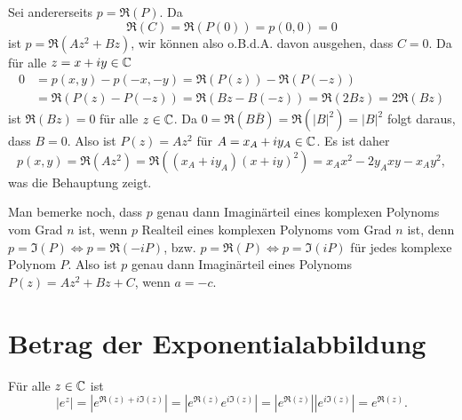 \documentclass[a4paper,10pt]{article}
\begin{document}
Sei andererseits $p = \Re(P)$. Da
\[
 \Re(C) = \Re(P(0)) = p(0,0) = 0
\]
ist $p = \Re(Az^2+Bz)$, wir können also o.B.d.A. davon ausgehen, dass $C=0$. Da für alle $z = x+iy \in \mathbb{C}$
\begin{align*}
 0 &= p(x,y) - p(-x,-y) = \Re(P(z))-\Re(P(-z)) \\
   &= \Re(P(z)-P(-z)) = \Re(Bz - B(-z)) = \Re(2Bz) = 2 \Re(Bz)
\end{align*}
ist $\Re(Bz) = 0$ für alle $z \in \mathbb{C}$. Da $0 = \Re(B \bar{B}) = \Re(|B|^2)= |B|^2$ folgt daraus, dass $B = 0$. Also ist $P(z) = Az^2$ für $A = x_A + iy_A \in \mathbb{C}$. Es ist daher
\[
 p(x,y) = \Re(Az^2) = \Re((x_A+iy_A)(x+iy)^2) = x_Ax^2 - 2y_Axy - x_A y^2,
\]
was die Behauptung zeigt.

Man bemerke noch, dass $p$ genau dann Imaginärteil eines komplexen Polynoms vom Grad $n$ ist, wenn $p$ Realteil eines komplexen Polynoms vom Grad $n$ ist, denn $p = \Im(P) \Leftrightarrow p = \Re(-iP)$, bzw. $p = \Re(P) \Leftrightarrow p = \Im(iP)$ für jedes komplexe Polynom $P$. Also ist $p$ genau dann Imaginärteil eines Polynoms $P(z) = Az^2+Bz+C$, wenn $a = -c$.





\section{Betrag der Exponentialabbildung}
Für alle $z \in \mathbb{C}$ ist
\[
 |e^z| = \left|e^{\Re(z)+i\Im(z)}\right| = \left|e^{\Re(z)} e^{i\Im(z)}\right|
 = \left|e^{\Re(z)}\right| \left|e^{i\Im(z)}\right| = e^{\Re(z)}.
\]
\end{document}

